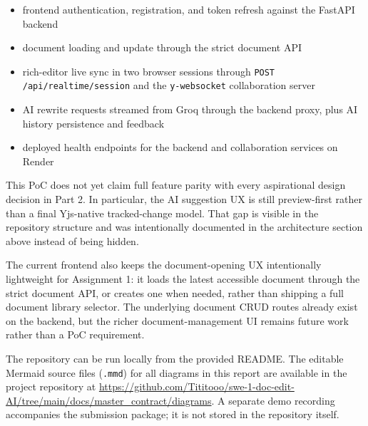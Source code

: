 \documentclass{article}
\begin{document}
\begin{itemize}
    \item frontend authentication, registration, and token refresh against the FastAPI backend
    \item document loading and update through the strict document API
    \item rich-editor live sync in two browser sessions through \texttt{POST /api/realtime/session} and the \texttt{y-websocket} collaboration server
    \item AI rewrite requests streamed from Groq through the backend proxy, plus AI history persistence and feedback
    \item deployed health endpoints for the backend and collaboration services on Render
\end{itemize}

This PoC does not yet claim full feature parity with every aspirational design decision in Part 2. In particular, the AI suggestion UX is still preview-first rather than a final Yjs-native tracked-change model. That gap is visible in the repository structure and was intentionally documented in the architecture section above instead of being hidden.

The current frontend also keeps the document-opening UX intentionally lightweight for Assignment 1: it loads the latest accessible document through the strict document API, or creates one when needed, rather than shipping a full document library selector. The underlying document CRUD routes already exist on the backend, but the richer document-management UI remains future work rather than a PoC requirement.

The repository can be run locally from the provided README. The editable Mermaid source files (\texttt{.mmd}) for all diagrams in this report are available in the project repository at \url{https://github.com/Tititooo/swe-1-doc-edit-AI/tree/main/docs/master_contract/diagrams}. A separate demo recording accompanies the submission package; it is not stored in the repository itself.
\end{document}
